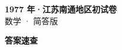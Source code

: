 \documentclass[zihao=-4, a4paper]{ctexart}
\begin{document}
\begin{center}
  {\Large\bfseries 1977 年·江苏南通地区初试卷}\\[4pt]
  {\large 数学 · 简答版}
\end{center}
\medskip
{}

\clearpage
{}
\begin{center}{\Large\bfseries 答案速查}\end{center}
\medskip

\end{document}
